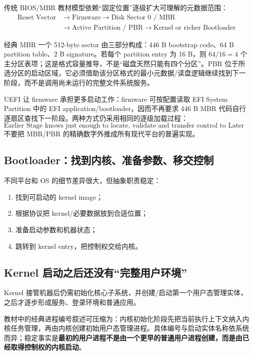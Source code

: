 \documentclass[11pt,a4paper]{ctexart}
\newcommand{\kw}[1]{\textbf{#1}}
\begin{document}
传统 BIOS/MBR 教材模型依赖“固定位置”逐级扩大可理解的元数据范围：
\[
\boxed{
\begin{aligned}
\text{Reset Vector}
&\to \text{Firmware}
\to \text{Disk Sector 0 / MBR}\\
&\to \text{Active Partition / PBR}
\to \text{Kernel or richer Bootloader}
\end{aligned}
}
\]

经典 MBR 一个 512-byte sector 由三部分构成：446 B bootstrap code、64 B partition table、2 B signature。若每个 partition entry 为 16 B，则 $64/16=4$ 个主分区表项；这是格式容量推导，不是“磁盘天然只能有四个分区”。PBR 位于所选分区的启动区域，它必须借助该分区格式的最小元数据/读盘逻辑继续找到下一阶段，而不是调用尚未运行的完整文件系统服务。

UEFI 让 firmware 承担更多启动工作：firmware 可按配置读取 EFI System Partition 中的 EFI application/bootloader，因而不再要求 446 B MBR 代码自行逐扇区查找下一阶段。两种方式仍采用相同的逐级加载过程：
\[
\boxed{\text{Earlier Stage knows just enough to locate, validate and transfer control to Later Stage}}
\]
不要把 MBR/PBR 的精确数字外推成所有现代平台的普遍实现。

\subsection{Bootloader：找到内核、准备参数、移交控制}

不同平台和 OS 的细节差异很大，但抽象职责稳定：
\begin{enumerate}
  \item 找到可启动的 kernel image；
  \item 根据协议把 kernel/必要数据放到合适位置；
  \item 准备启动参数和机器状态；
  \item 跳转到 kernel entry，把控制权交给内核。
\end{enumerate}

\subsection{Kernel 启动之后还没有“完整用户环境”}

Kernel 接管机器后仍需初始化核心子系统，并创建/启动第一个用户态管理实体，之后才逐步形成服务、登录环境和普通应用。

教材中的经典进程编号叙述可压缩为：内核初始化阶段先把当前执行上下文纳入内核任务管理，再由内核创建初始用户态管理进程。具体编号与启动实体名称依系统而异；稳定事实是\kw{最初的用户进程不是由一个更早的普通用户进程创建，而是由已经取得控制权的内核启动}。
\end{document}
